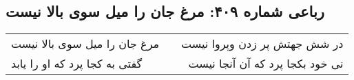 \begin{center}
\section*{رباعی شماره ۴۰۹: مرغ جان را میل سوی بالا نیست}
\label{sec:0409}
\begin{longtable}{l p{0.5cm} r}
مرغ جان را میل سوی بالا نیست
&&
در شش جهتش پر زدن وپروا نیست
\\
گفتی به کجا پرد که او را یابد
&&
نی خود بکجا پرد که آن آنجا نیست
\\
\end{longtable}
\end{center}
